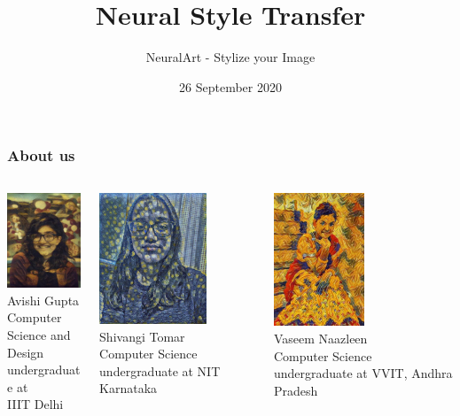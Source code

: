 \documentclass[14pt]{beamer}
\title[NST]{Neural Style Transfer}
\subtitle{NeuralArt - Stylize your Image}
\date{26 September 2020}
\begin{document}
\bgroup
{}
\begin{frame}[plain]{}
\end{frame}
\egroup


\begin{frame}
   \titlepage
\end{frame}

\begin{frame}
    \frametitle{About us}
    \begin{columns}
        \begin{column}{0.33\textwidth}
            \includegraphics[width=30mm]{Avishi.jpg}\\
            \small Avishi Gupta\\
            
            \scriptsize Computer Science and\\Design undergraduate at\\IIIT Delhi
        \end{column}
        \begin{column}{0.33\textwidth}
            \includegraphics[width=32mm]{sshivangi.jpg}\\
            \small Shivangi Tomar\\
       
            \scriptsize Computer Science undergraduate at NIT Karnataka
        \end{column}
        \begin{column}{0.33\textwidth}
            \includegraphics[width=27mm]{vnaaz.jpg}\\
            \small Vaseem Naazleen\\
            \scriptsize Computer Science undergraduate at VVIT, Andhra Pradesh
        \end{column}
    \end{columns}
\end{frame}
\end{document}
